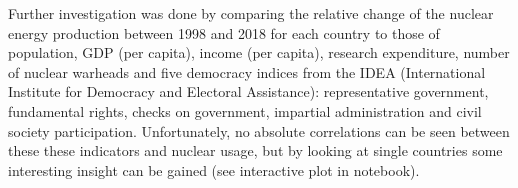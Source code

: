 \documentclass[a4paper,10pt,twocolumn]{scrartcl}
\begin{document}
Further investigation was done by comparing the relative change of the nuclear energy production between 1998 and 2018 for each country to those of population, GDP (per capita), income (per capita), research expenditure, number of nuclear warheads and five democracy indices from the IDEA (International Institute for Democracy and Electoral Assistance): representative government, fundamental rights, checks on government, impartial administration and civil society participation. Unfortunately, no absolute correlations can be seen between these these indicators and nuclear usage, but by looking at single countries some interesting insight can be gained (see interactive plot in notebook).
\end{document}
